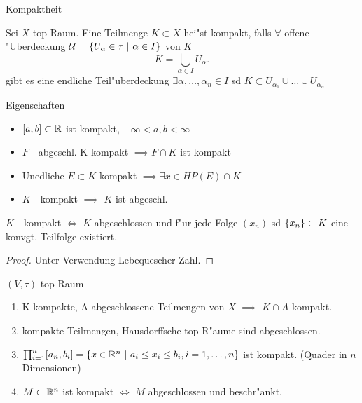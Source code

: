 \documentclass[class=article, crop=false]{standalone}
\begin{document}
\begin{zettel}{Kompaktheit}
\begin{definition}
    Sei $X$-top Raum. Eine Teilmenge $K \subset  X$ hei"st kompakt, falls $\forall $ offene "Uberdeckung $\mathcal{U} =\set{U_{\alpha}\in  \tau}{\alpha \in I}$ von $K$ 
\[
    K = \bigcup_{\alpha \in  I} U_\alpha
.\]
gibt es eine endliche Teil"uberdeckung $\exists \alpha, \dots, \alpha_n \in  I$ sd $K \subset  U_{\alpha_{1}} \cup \dots \cup U_{\alpha_n}$ 
\end{definition}

\begin{remark}
    Eigenschaften
\begin{itemize}
    \item $[a,b] \subset \mathbb{R}$ ist kompakt,  $-\infty < a,b < \infty $
    \item $F$ - abgeschl. K-kompakt $\implies F \cap K$ ist kompakt
    \item Unedliche $E \subset K $-kompakt  $\implies \exists x \in  HP (E) \cap K$ 
    \item $K$ - kompakt $\implies $ $K$ ist abgeschl.
\end{itemize}
\end{remark}

\begin{theorem}
$K$ - kompakt $\iff  $  $K$ abgeschlossen und f"ur jede Folge $(x_n )$ sd $\set{x_n } \subset K$ eine konvgt. Teilfolge existiert.
\begin{proof}
    Unter Verwendung Lebequescher Zahl.
\end{proof}
\end{theorem}
    \begin{theorem}
    $(V,\tau)$-top Raum
    \begin{enumerate}
        \item K-kompakte, A-abgeschlossene Teilmengen von $X$ $\implies $ $K \cap A$ kompakt. 
        \item kompakte Teilmengen, Hausdorffsche top R"aume sind abgeschlossen.
    \item $\prod_{i=1}^n [a_n,b_i] = \set{x \in  \R ^{n}}{ a_i \leq x_i \leq  b_i, i=1,\dots,n}$ ist kompakt. (Quader in $n$ Dimensionen)
    \item $M \subset  \mathbb{R} ^n$ ist kompakt $\iff $ $M$ abgeschlossen und beschr"ankt.
    \end{enumerate}
    \end{theorem}


\end{zettel}
\end{document}
